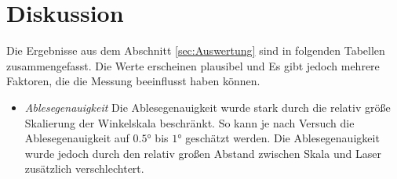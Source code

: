 \section{Diskussion}
\label{sec:Diskussion}
Die Ergebnisse aus dem Abschnitt \ref{sec:Auswertung} sind in folgenden Tabellen zusammengefasst.
Die Werte erscheinen plausibel und %
Es gibt jedoch mehrere Faktoren, die die Messung beeinflusst haben können.
\begin{itemize}
    \item \textit{Ablesegenauigkeit}
        Die Ablesegenauigkeit wurde stark durch die relativ größe Skalierung der Winkelskala beschränkt.
        So kann je nach Versuch die Ablesegenauigkeit auf $\num{0.5}°$ bis $\num{1}°$ geschätzt werden.
        Die Ablesegenauigkeit wurde jedoch durch den relativ großen Abstand zwischen Skala und Laser 
        zusätzlich verschlechtert.
\end{itemize}